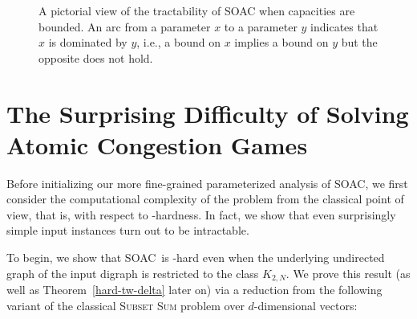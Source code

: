 \documentclass[letterpaper]{article} %
\newcommand{\problem}{{\sc SOAC}\xspace} %
\begin{document}
\begin{figure}
\centering
{}
\caption{A pictorial view of the tractability of \problem when capacities are bounded.
An arc from a parameter $x$ to a parameter $y$ indicates that $x$ is dominated by $y$, i.e., a bound on $x$ implies a bound on $y$ but the opposite does not hold.}
\label{fig:pararel}
\end{figure}


\section{The Surprising Difficulty of Solving Atomic Congestion Games}
\label{sec:nph}
Before initializing our more fine-grained parameterized analysis of \problem, we first
consider the computational complexity of the problem from the classical point of view, that is, with respect to \NP-hardness. In fact, we show that even surprisingly simple input instances turn out to be intractable.

To begin, we show that \problem\ is \NP-hard even when the underlying undirected graph of the input digraph is restricted to the class $K_{2,N}$. We prove this result (as well as Theorem~\ref{hard-tw-delta} later on) via a reduction from the following variant of the classical \textsc{Subset Sum} problem over $d$-dimensional vectors:
\end{document}
